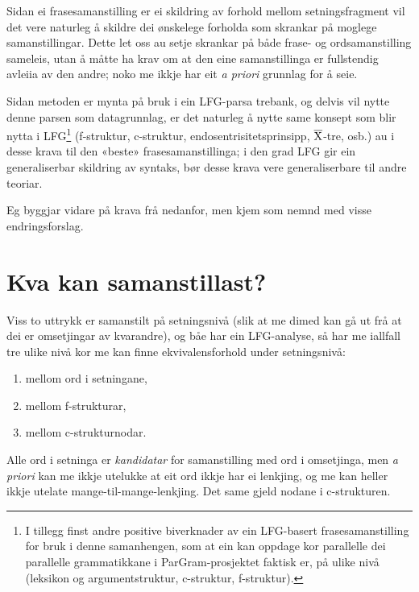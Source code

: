 \documentclass[11pt,a4paper,oneside,draft]{book}
\newcommand{\xbar}{$\rm\overline{X}$}
\begin{document}
Sidan ei frasesamanstilling er ei skildring av forhold mellom
setningsfragment vil det vere naturleg å skildre dei ønskelege
forholda som skrankar på moglege samanstillingar. Dette let oss au
setje skrankar på både frase- og ordsamanstilling sameleis, utan å
måtte ha krav om at den eine samanstillinga er fullstendig avleiia av
den andre; noko me ikkje har eit \emph{a priori} grunnlag for å seie. 

Sidan metoden er mynta på bruk i ein LFG-parsa trebank, og delvis vil
nytte denne parsen som datagrunnlag, er det naturleg å nytte same
konsept som blir nytta i LFG\footnote{I tillegg finst andre positive biverknader av ein LFG-basert
 frasesamanstilling for bruk i denne samanhengen, som at ein kan
 oppdage kor parallelle dei parallelle grammatikkane i
 ParGram-prosjektet \citep{butt2002pgp} faktisk er, på ulike nivå
 (leksikon og argumentstruktur, c-struktur, f-struktur). } (f-struktur, c-struktur,
endosentrisitetsprinsipp, \xbar{}-tre, osb.)  au i desse krava til den
«beste» frasesamanstillinga; i den grad LFG gir ein generaliserbar
skildring av syntaks, bør desse krava vere generaliserbare til andre
teoriar.

Eg byggjar vidare på krava frå \citet{thunes2003eal} nedanfor, men
kjem som nemnd med visse endringsforslag.

\section{Kva kan samanstillast?}
\label{sec-3.5}


Viss to uttrykk er samanstilt på setningsnivå (slik at me dimed kan gå
ut frå at dei er omsetjingar av kvarandre), og båe har ein
LFG-analyse, så har me iallfall tre ulike nivå kor me kan finne
ekvivalensforhold under setningsnivå:
\begin{enumerate}
\item mellom ord i setningane,
\item mellom f-strukturar,
\item mellom c-strukturnodar.
\end{enumerate}
Alle ord i setninga er \emph{kandidatar} for samanstilling med ord i
omsetjinga, men \emph{a priori} kan me ikkje utelukke at eit ord ikkje har ei
lenkjing, og me kan heller ikkje utelate mange-til-mange-lenkjing. Det
same gjeld nodane i c-strukturen.

\end{document}
